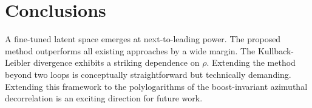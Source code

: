 \section{Conclusions}\label{sec:conclusions}

A fine-tuned latent space emerges at next-to-leading power. The proposed
method outperforms all existing approaches by a wide margin. The
Kullback-Leibler divergence exhibits a striking dependence on $\rho$.
Extending the method beyond two loops is conceptually straightforward
but technically demanding. Extending this framework to the
polylogarithms of the boost-invariant azimuthal decorrelation is an
exciting direction for future work.

